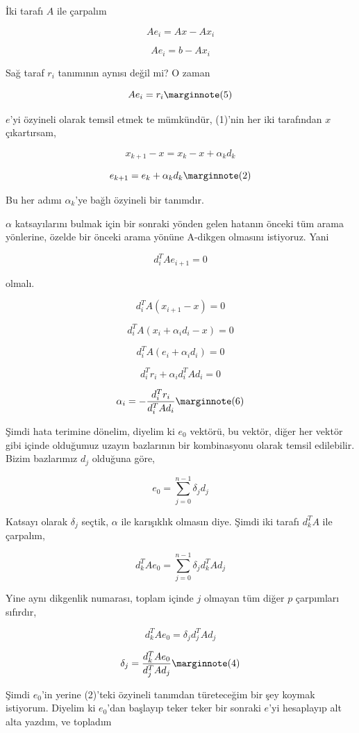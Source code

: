 \documentclass[12pt,fleqn]{article}\usepackage{../../common}
\begin{document}
İki tarafı $A$ ile çarpalım

$$ Ae_i = Ax - Ax_i  $$

$$ Ae_i = b - Ax_i  $$

Sağ taraf $r_i$ tanımının aynısı değil mi? O zaman 

$$
Ae_i = r_i 
\mlabel{5}
$$

$e$'yi özyineli olarak temsil etmek te mümkündür, (1)'nin her iki
tarafından $x$ çıkartırsam, 

$$ x_{k+1} - x = x_k - x + \alpha_k d_{k} $$

$$ e_{k+1} = e_k + \alpha_k d_k 
\mlabel{2}
$$

Bu her adımı $\alpha_k$'ye bağlı özyineli bir tanımdır. 

$\alpha$ katsayılarını bulmak için bir sonraki yönden gelen hatanın önceki
tüm arama yönlerine, özelde bir önceki arama yönüne A-dikgen
olmasını istiyoruz. Yani

$$ d_i^TA e_{i+1}  = 0$$

olmalı. 

$$ d_i^TA (x_{i+1}-x)  = 0$$

$$ d_i^TA (x_{i} + \alpha_i d_i -x)  = 0$$

$$ d_i^TA (e_i + \alpha_i d_i )  = 0$$

$$ d_i^Tr_i + \alpha_i d_i^TA d_i   = 0$$

$$ 
\alpha_i = -\frac{ d_i^Tr_i}{d_i^T A d_i} 
\mlabel{6}
$$

Şimdi hata terimine dönelim, diyelim ki $e_0$ vektörü, bu vektör, diğer
her vektör gibi içinde olduğumuz uzayın bazlarının bir kombinasyonu olarak
temsil edilebilir. Bizim bazlarımız $d_j$ olduğuna göre, 

$$ e_0 = \sum_{ j=0}^{n-1} \delta_j d_j $$

Katsayı olarak $\delta_j$ seçtik, $\alpha$ ile karışıklık olmasın
diye. Şimdi iki tarafı $d_k^T A$ ile çarpalım, 

$$ d_k^T A e_0 = \sum_{ j=0}^{n-1} \delta_j d_k^T A d_j $$

Yine aynı dikgenlik numarası, toplam içinde $j$ olmayan tüm diğer $p$
çarpımları sıfırdır, 

$$ d_k^T A e_0 =  \delta_j d_j^T A d_j $$

$$ \delta_j = \frac{ d_k^T A e_0}{ d_j^T A d_j } 
\mlabel{4}
$$

Şimdi $e_0$'in yerine (2)'teki özyineli tanımdan türeteceğim bir şey koymak
istiyorum. Diyelim ki $e_0$'dan başlayıp teker teker bir sonraki $e$'yi
hesaplayıp alt alta yazdım, ve topladım
\end{document}
